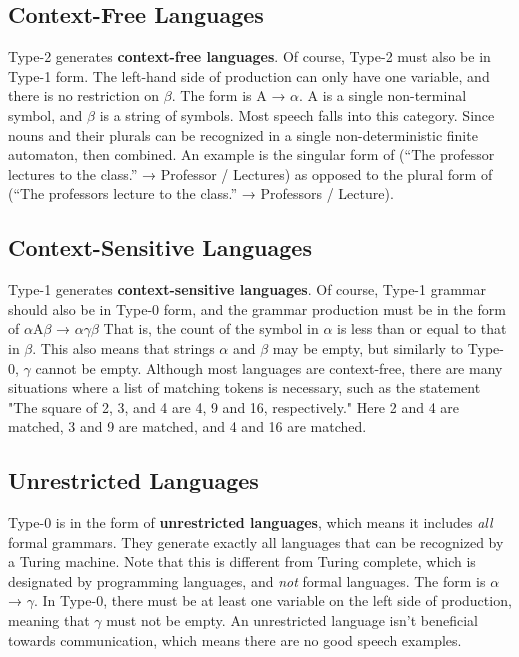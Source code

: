 \documentclass{article}
\begin{document}
\subsection{Context-Free Languages}

Type-2 generates \textbf{context-free languages}. Of course, Type-2 must also be in Type-1 form. The left-hand side of production can only have one variable, and there is no restriction on $\beta$.
The form is A → $\alpha$. A is a single non-terminal symbol, and $\beta$ is a string of symbols. Most speech falls into this category. Since nouns and their plurals can be recognized in a single
non-deterministic finite automaton, then combined. An example is the singular form of (“The professor lectures to the class.” → Professor / Lectures) as opposed to the plural form of 
(“The professors lecture to the class.” → Professors / Lecture).


\subsection{Context-Sensitive Languages}

Type-1 generates \textbf{context-sensitive languages}. Of course, Type-1 grammar should also be in Type-0 form, and the grammar production must be in the form of 
$\alpha$A$\beta$ → $\alpha$$\gamma$$\beta$ That is, the count of the symbol in $\alpha$ is less than or equal to that in $\beta$. This also means that strings $\alpha$ and $\beta$ may be empty, but similarly to 
Type-0, $\gamma$ cannot be empty. Although most languages are context-free, there are many situations where a list of matching tokens is necessary, such as the 
statement "The square of 2, 3, and 4 are 4, 9 and 16, respectively." Here 2 and 4 are matched, 3 and 9 are matched, and 4 and 16 are matched.


\subsection{Unrestricted Languages} 

Type-0 is in the form of \textbf{unrestricted languages}, which means it includes \textit{all} formal grammars. They generate exactly all languages that can be recognized by a 
Turing machine. Note that this is different from Turing complete, which is designated by programming languages, and \textit{not} formal languages. The form is $\alpha$ → $\gamma$. 
In Type-0, there must be at least one variable on the left side of production, meaning that $\gamma$ must not be empty. An unrestricted language isn't beneficial towards 
communication, which means there are no good speech examples.
\end{document}
